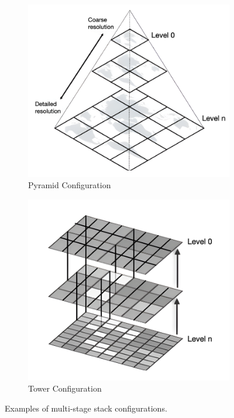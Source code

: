 \begin{figure}[!h]
\centering
\begin{subfigure}{0.49\linewidth}
\includegraphics[width=\linewidth]{img/ch4/pyramid.png}
\caption{Pyramid Configuration}
\end{subfigure}
\begin{subfigure}{0.49\linewidth}
\includegraphics[width=\linewidth]{img/ch4/tower.png}    
\caption{Tower Configuration}
\end{subfigure}
\caption{Examples of multi-stage stack configurations.}
\label{f:multi}
\end{figure}

